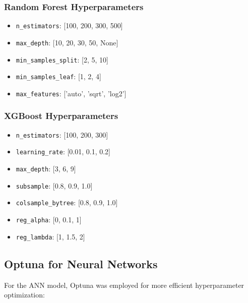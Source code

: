 \documentclass[12pt]{article}
\begin{document}
\subsubsection{Random Forest Hyperparameters}
\begin{itemize}
    \item \texttt{n\_estimators}: [100, 200, 300, 500]
    \item \texttt{max\_depth}: [10, 20, 30, 50, None]
    \item \texttt{min\_samples\_split}: [2, 5, 10]
    \item \texttt{min\_samples\_leaf}: [1, 2, 4]
    \item \texttt{max\_features}: ['auto', 'sqrt', 'log2']
\end{itemize}

\subsubsection{XGBoost Hyperparameters}
\begin{itemize}
    \item \texttt{n\_estimators}: [100, 200, 300]
    \item \texttt{learning\_rate}: [0.01, 0.1, 0.2]
    \item \texttt{max\_depth}: [3, 6, 9]
    \item \texttt{subsample}: [0.8, 0.9, 1.0]
    \item \texttt{colsample\_bytree}: [0.8, 0.9, 1.0]
    \item \texttt{reg\_alpha}: [0, 0.1, 1]
    \item \texttt{reg\_lambda}: [1, 1.5, 2]
\end{itemize}

\subsection{Optuna for Neural Networks}
\label{subsec:optuna}

For the ANN model, Optuna was employed for more efficient hyperparameter optimization:
\end{document}

